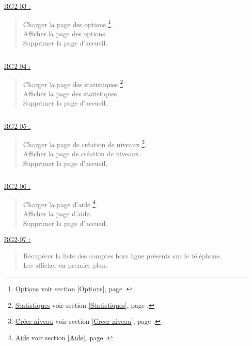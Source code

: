 \documentclass{report}
\begin{document}
		$\,$
		
		\underline{RG2-03 :}
			\begin{quote}
				Charger la page des options%
					\footnote{
						\hyperlink{Options}{Options}
						\og voir section \ref{Options}, page \pageref{Options}.\fg
					}.\\
				Afficher la page des options\footnotemark[5].\\
				Supprimer la page d'accueil\footnotemark[2].
			\end{quote}


		$\,$

		\underline{RG2-04 :}
			\begin{quote}
				Charger la page des statistiques%
					\footnote{
						\hyperlink{Statistiques}{Statistiques}
						\og voir section \ref{Statistiques}, page \pageref{Statistiques}.\fg
					}.\\
				Afficher la page des statistiques\footnotemark[6].\\
				Supprimer la page d'accueil\footnotemark[2].
			\end{quote}

		$\,$

		\underline{RG2-05 :}
			\begin{quote}
				Charger la page de création de niveaux%
					\footnote{
						\hyperlink{Creer niveau}{Créer niveau}
						\og voir section \ref{Creer niveau}, page \pageref{Creer niveau}.\fg
					}.\\
				Afficher la page de création de niveaux\footnotemark[7].\\
				Supprimer la page d'accueil\footnotemark[2].		
			\end{quote}

		$\,$

		\underline{RG2-06 :}
			\begin{quote}
				Charger la page d'aide%
					\footnote{
						\hyperlink{Aide}{Aide}
						\og voir section \ref{Aide}, page \pageref{Aide}.\fg
					}.\\
				Afficher la page d'aide\footnotemark[8].\\
				Supprimer la page d'accueil\footnotemark[2].\\		
			\end{quote}
			
			
		\underline{RG2-07 :}
			\begin{quote}
				Récupérer la liste des comptes hors ligne présents sur le téléphone.\\
				Les afficher en premier plan.\\
			\end{quote}
\end{document}
